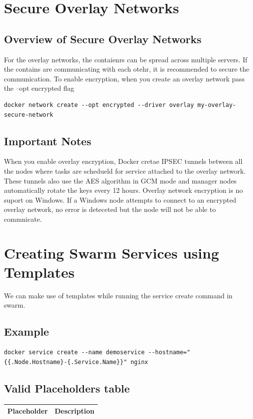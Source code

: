 \documentclass[11pt]{book}
\begin{document}
    \section{Secure Overlay Networks}
    \subsection{Overview of Secure Overlay Networks}
    For the overlay networks, the contaienrs can be spread across multiple servers.
    If the contains are communicating with each otehr, it is recommended to secure the communication.
    To enable encryption, when you create an overlay network pass the --opt encrypted flag

    \begin{lstlisting}[style=terminal]
        docker network create --opt encrypted --driver overlay my-overlay-secure-network
    \end{lstlisting}

    \subsection{Important Notes}
    When you enable overlay encryption, Docker cretae IPSEC tunnels between all the nodes where tasks are schedueld for service attached to the overlay network.
    These tunnels also use the AES algorithm in GCM mode and manager nodes automatically rotate the keys every 12 hours.
    Overlay network encryption is no suport on Windows. If a Windows node attempts to connect to an encrypted overlay network, no error is deteceted but the node will not be able to commnicate.

    \section{Creating Swarm Services using Templates}
    We can make use of templates while running the service create command in swarm.

    \subsection{Example}
    \begin{lstlisting}[style=terminal]
        docker service create --name demoservice --hostname="{{.Node.Hostname}-{.Service.Name}}" nginx
    \end{lstlisting}

    \subsection{Valid Placeholders table}
    \begin{table}[ht]
        \centering
        \begin{tabular}{|c|c|}
            \hline
            Placeholder & Description                                                            \\ \hline
        \end{tabular}
    \end{table}
\end{document}
